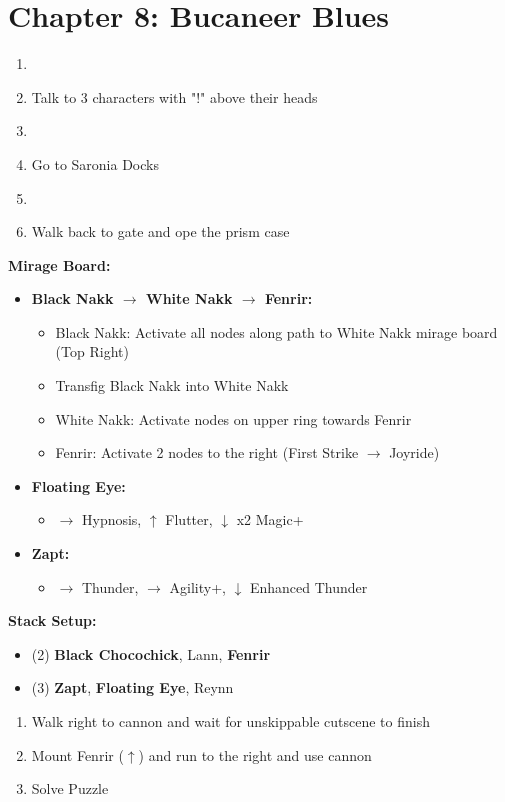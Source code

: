 \chapter{Chapter 8: Bucaneer Blues}
\begin{enumerate}
	\item \cs
	\item Talk to 3 characters with "!" above their heads
	\item \cs
	\item Go to Saronia Docks
	\item \cs
	\item Walk back to gate and ope the prism case
\end{enumerate}
\begin{menu}
\textbf{Mirage Board:}
	\begin{itemize}
		\item \textbf{Black Nakk $\rightarrow$ White Nakk $\rightarrow$ Fenrir:}
			\begin{itemize}
				\item Black Nakk: Activate all nodes along path to White Nakk mirage board (Top Right)
				\item Transfig Black Nakk into White Nakk
				\item White Nakk: Activate nodes on upper ring towards Fenrir
				\item Fenrir: Activate 2 nodes to the right (First Strike $\rightarrow$ Joyride)
			\end{itemize}
		\item \textbf{Floating Eye:}
			\begin{itemize}
				\item $\rightarrow$ Hypnosis, $\uparrow$ Flutter, $\downarrow$ x2 Magic+
			\end{itemize}
		\item \textbf{Zapt:}
			\begin{itemize}
				\item $\rightarrow$ Thunder, $\rightarrow$ Agility+, $\downarrow$ Enhanced Thunder
			\end{itemize}
	\end{itemize}
\textbf{Stack Setup:}
	\begin{itemize}
		\item (2) \textbf{Black Chocochick}, Lann, \textbf{Fenrir}
		\item (3) \textbf{Zapt}, \textbf{Floating Eye}, Reynn
	\end{itemize}
\end{menu}
\begin{enumerate}[resume]
	\item Walk right to cannon and wait for unskippable cutscene to finish
	\item Mount Fenrir ($\uparrow$) and run to the right and use cannon
	\item Solve Puzzle
\end{enumerate}
